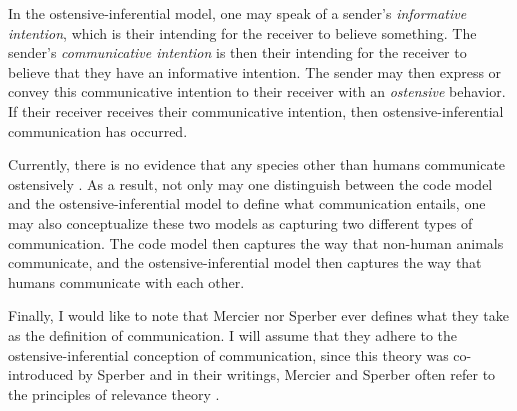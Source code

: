 In the ostensive-inferential model, one may speak of a sender's \emph{informative intention}, which is their intending for the receiver to believe something. The sender's \emph{communicative intention} is then their intending for the receiver to believe that they have an informative intention. The sender may then express or convey this communicative intention to their receiver with an \emph{ostensive} behavior. If their receiver receives their communicative intention, then ostensive-inferential communication has occurred.

Currently, there is no evidence that any species other than humans communicate ostensively \citep{Scott-Phillips18-communication}. As a result, not only may one distinguish between the code model and the ostensive-inferential model to define what communication entails, one may also conceptualize these two models as capturing two different types of communication. The code model then captures the way that non-human animals communicate, and the ostensive-inferential model then captures the way that humans communicate with each other.

Finally, I would like to note that Mercier nor Sperber ever defines what they take as the definition of communication. I will assume that they adhere to the ostensive-inferential conception of communication, since this theory was co-introduced by Sperber \citep{SperberWilson86} and in their writings, Mercier and Sperber often refer to the principles of relevance theory \citep{MS09, MS11, Sperber10}.


